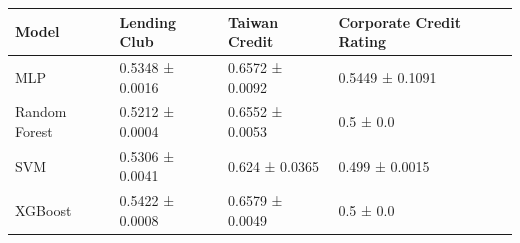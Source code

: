\begin{tabular}{llll}
\toprule
Model & Lending Club & Taiwan Credit & Corporate Credit Rating \\
\midrule
MLP & 0.5348 ± 0.0016 & 0.6572 ± 0.0092 & 0.5449 ± 0.1091 \\
Random Forest & 0.5212 ± 0.0004 & 0.6552 ± 0.0053 & 0.5 ± 0.0 \\
SVM & 0.5306 ± 0.0041 & 0.624 ± 0.0365 & 0.499 ± 0.0015 \\
XGBoost & 0.5422 ± 0.0008 & 0.6579 ± 0.0049 & 0.5 ± 0.0 \\
\bottomrule
\end{tabular}

